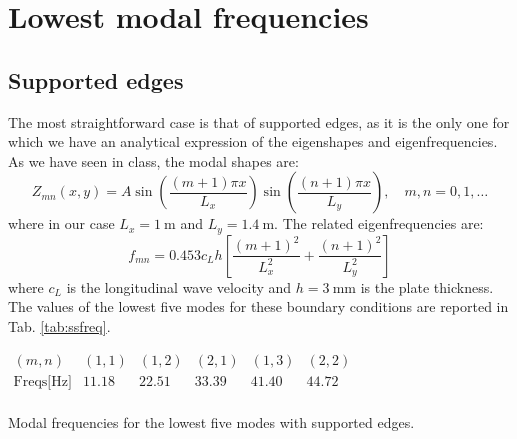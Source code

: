 \documentclass[a4paper]{article}
\begin{document}
\begin{titlepage}
	
	\vfill\vfill
	
	
	\vfill %
	
	
\end{titlepage}


\section{Lowest modal frequencies}
\subsection{Supported edges}
The most straightforward case is that of supported edges, as it is the only one for which we have an analytical expression of the eigenshapes and eigenfrequencies. As we have seen in class, the modal shapes are:
$$ Z_{mn}(x, y) = A\sin\left( 	\frac{(m+1)\pi x}{L_x} \right) \sin\left( 	\frac{(n+1)\pi x}{L_y} \right), \quad m,n = 0, 1, \dots$$
where in our case $L_x = \SI{1}{\meter}$ and $L_y = \SI{1.4}{\meter}$.
The related eigenfrequencies are:
$$ f_{mn} = 0.453c_L h \left[\frac{(m+1)^2}{L_x^2} + \frac{(n+1)^2}{L_y^2}\right] $$
where $c_L$ is the longitudinal wave velocity and $h = \SI{3}{\milli\meter}$ is the plate thickness. The values of the lowest five modes for these boundary conditions are reported in Tab. \ref{tab:ssfreq}.

\begin{table}[h]
	\centering
	$\begin{array}{l|lllll}
		(m,n) & (1,1) & (1,2) & (2,1) & (1,3) & (2,2) \\
		\hline
		\text{Freqs[Hz]} & 11.18 & 22.51 & 33.39 & 41.40 & 44.72\\
	\end{array}$
	\caption{Modal frequencies for the lowest five modes with supported edges.}
	\label{tab:ssfreq}
\end{table}
\end{document}
